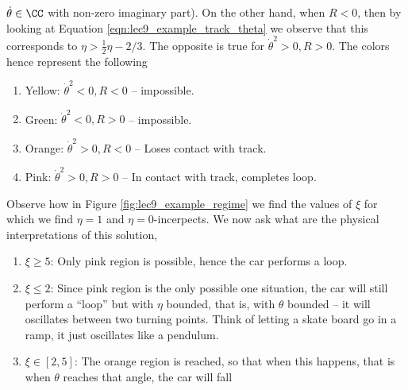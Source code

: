 $\dot{\theta}\in\CC$ with non-zero imaginary part). On the other hand, when
$R<0$, then by looking at Equation \ref{eqn:lec9_example_track_theta} we observe
that this corresponds to $\eta>\frac{1}{2}\eta -2/3$. The opposite is true for
$\dot{\theta}^2>0, R>0$. The colors hence represent the following
\begin{enumerate}
  \item Yellow: $\dot{\theta}^2<0, R<0$ -- impossible.
  \item Green: $\dot{\theta}^2 <0, R>0$ -- impossible.
  \item Orange: $\dot{\theta}^2>0, R<0$ -- Loses contact with track.
  \item Pink: $\dot{\theta}^2>0, R>0$ -- In contact with track, completes loop.
\end{enumerate}
 Observe how in Figure
\ref{fig:lec9_example_regime} we find the values of $\xi$ for which we find
$\eta=1$ and $\eta=0$-incerpects. We now ask what are the physical
interpretations of this solution,
\begin{enumerate}
  \item $\xi\geq 5$: Only pink region is possible, hence the car performs a
    loop.
  \item $\xi\leq 2$: Since pink region is the only possible one situation, the
    car will still perform a ``loop'' but with $\eta$ bounded, that is, with
    $\theta$ bounded -- it will oscillates between two turning points. Think of
    letting a skate board go in a ramp, it just oscillates like a pendulum.
  \item $\xi\in [2,5]$: The orange region is reached, so that when this happens,
    that is when $\theta$ reaches that angle, the car will fall
\end{enumerate}

